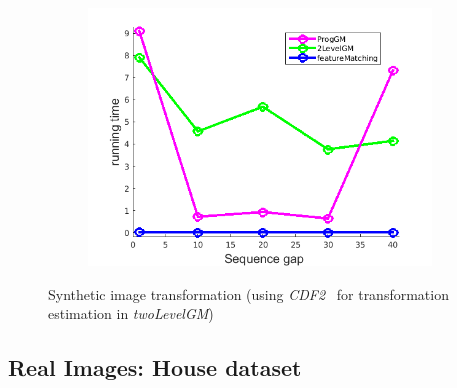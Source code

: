 \documentclass[
	fontsize=12pt,
	paper=a4,
	twoside=false,
	numbers=noenddot,
	plainheadsepline,
	toc=listof,
	toc=bibliography
]{scrartcl}
\begin{document}
\begin{figure}[h]
\begin{subfigure}[b]{0.3\textwidth}
		\includegraphics[scale=0.25]{"fig_ver2608/RealImages/ImgTrafo/anchor_descr/using_cpd_afftrafo/performance/time"}  
	\end{subfigure} 	
	\caption{Synthetic image transformation (using \emph{CDF2}~\cite{Myronenko2009_CPD} for transformation estimation in \emph{twoLevelGM})}
\end{figure}
\FloatBarrier


\newpage
\subsection{Real Images: House dataset}
\end{document}
